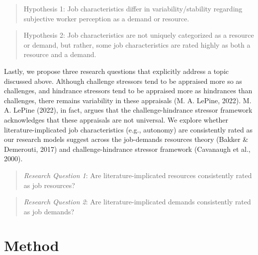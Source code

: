 \documentclass[
  english,
  man]{apa6}
\begin{document}
\begin{quote}
Hypothesis 1: Job characteristics differ in variability/stability regarding subjective worker perception as a demand or resource.
\end{quote}

\begin{quote}
Hypothesis 2: Job characteristics are not uniquely categorized as a resource or demand, but rather, some job characteristics are rated highly as both a resource and a demand.
\end{quote}

Lastly, we propose three research questions that explicitly address a topic discussed above. Although challenge stressors tend to be appraised more so as challenges, and hindrance stressors tend to be appraised more as hindrances than challenges, there remains variability in these appraisals (M. A. LePine, 2022). M. A. LePine (2022), in fact, argues that the challenge-hindrance stressor framework acknowledges that these appraisals are not universal. We explore whether literature-implicated job characteristics (e.g., autonomy) are consistently rated as our research models suggest across the job-demands resources theory (Bakker \& Demerouti, 2017) and challenge-hindrance stressor framework (Cavanaugh et al., 2000).

\begin{quote}
\emph{Research Question 1}: Are literature-implicated resources consistently rated as job resources?
\end{quote}

\begin{quote}
\emph{Research Question 2}: Are literature-implicated demands consistently rated as job demands?
\end{quote}

\hypertarget{method}{%
\section{Method}\label{method}}
\end{document}
